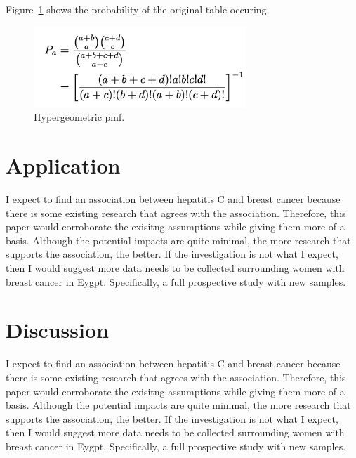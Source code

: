 \documentclass[12pt, titlepage]{article}
\begin{document}
Figure~\ref{fig:formula} shows the probability of the original table occuring.

\begin{figure}[tbp]
  \centering
  \includegraphics[width=8cm]{formula.png}
  \caption{Hypergeometric pmf.}
  \label{fig:formula}
\end{figure}


\section{Application}
\label{sec:app}

I expect to find an association between hepatitis C and breast cancer because there is some existing research that agrees with the association.
Therefore, this paper would corroborate the exisitng assumptions while giving them more of a basis. Although the potential impacts are quite 
minimal, the more research that supports the association, the better. If the investigation is not what I expect, then I would suggest more
data needs to be collected surrounding women with breast cancer in Eygpt. Specifically, a full prospective study with new samples. 


\section{Discussion}
\label{sec:discuss}

I expect to find an association between hepatitis C and breast cancer because there is some existing research that agrees with the association.
Therefore, this paper would corroborate the exisitng assumptions while giving them more of a basis. Although the potential impacts are quite 
minimal, the more research that supports the association, the better. If the investigation is not what I expect, then I would suggest more
data needs to be collected surrounding women with breast cancer in Eygpt. Specifically, a full prospective study with new samples. 




\end{document}
